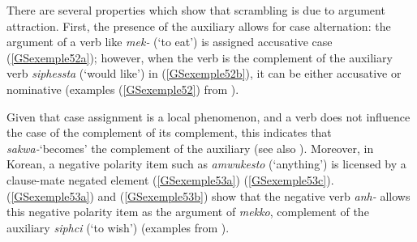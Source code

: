\documentclass[output=paper
	        ,collection
	        ,collectionchapter
 	        ,biblatex
                ,babelshorthands
                ,newtxmath
                ,draftmode
                ,colorlinks, citecolor=brown
]{langscibook}
\begin{document}
{There are several properties which show that scrambling is due to argument attraction. First, the presence of the auxiliary allows for case alternation: the argument of a verb like \emph{mek-} (`to eat') is assigned accusative case (\ref{GSexemple52a}); however, when the verb is the complement of the auxiliary verb \emph{siphessta} (`would like') in (\ref{GSexemple52b}), it can be either accusative or nominative (examples (\ref{GSexemple52}) from \citealt[87]{Kim2016a-u}).

\eal
	\label{GSexemple52}
	\label{GSexemple52a}
		
	\label{GSexemple52b}
\zl

Given that case assignment is a local phenomenon, and a verb does not influence the case of the complement of its complement, this indicates that \emph{sakwa-}`becomes' the complement of the auxiliary (see also \citealt{Yoo2003}). Moreover, in Korean, a negative polarity item such as \emph{amwukesto} (`anything') is licensed by a clause-mate negated element (\ref{GSexemple53a}) (\ref{GSexemple53c}). (\ref{GSexemple53a}) and (\ref{GSexemple53b}) show that the negative verb \emph{anh-} allows this negative polarity item as the argument of \emph{mekko}, complement of the auxiliary \emph{siphci} (`to wish') (examples from \citealt[91]{Kim2016a-u}).

\eal
	\label{GSexemple53}
	\label{GSexemple53a}
		
	\label{GSexemple53b}
	
}
\end{document}
